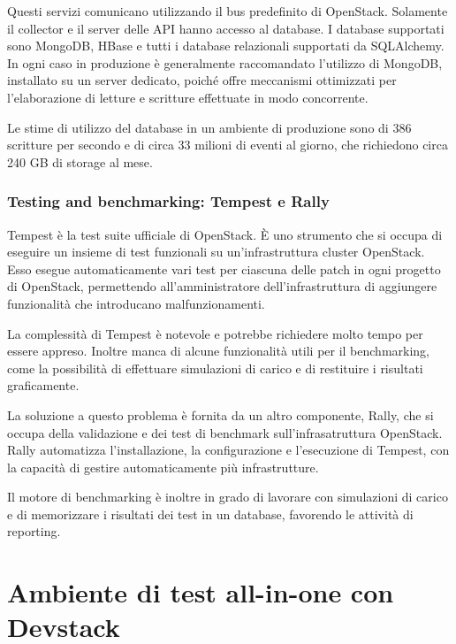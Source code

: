 \documentclass[../main.tex]{subfiles}
\begin{document}
Questi servizi comunicano utilizzando il bus predefinito di OpenStack. Solamente il collector e il server delle API hanno accesso al database.
I database supportati sono MongoDB, HBase e tutti i database relazionali  supportati da SQLAlchemy.
In ogni caso in produzione è generalmente raccomandato l'utilizzo di MongoDB,  installato su un server dedicato, poiché offre meccanismi ottimizzati per l'elaborazione di letture e scritture effettuate in modo concorrente.

Le stime di utilizzo del database in un ambiente di produzione sono di 386 scritture per secondo e di circa 33 milioni di eventi al giorno, che richiedono circa 240 GB di storage al mese.

\subsubsection{Testing and benchmarking: Tempest e Rally}
Tempest è la test suite ufficiale di OpenStack. \`E uno strumento che si occupa di eseguire un insieme di test funzionali su un'infrastruttura cluster OpenStack.
Esso esegue automaticamente vari test per ciascuna delle patch in ogni progetto di OpenStack, permettendo all'amministratore dell'infrastruttura di aggiungere funzionalità che introducano malfunzionamenti.

La complessità di Tempest è notevole e potrebbe richiedere molto tempo per essere appreso. Inoltre manca di alcune funzionalità utili per il benchmarking, come la possibilità di effettuare simulazioni di carico e di restituire i risultati graficamente.

La soluzione a questo problema è fornita da un altro componente, Rally, che si occupa della validazione e dei test di benchmark sull'infrasatruttura OpenStack.
Rally automatizza l'installazione, la configurazione e l'esecuzione di Tempest, con la capacità di gestire automaticamente più infrastrutture.

Il motore di benchmarking è inoltre in grado di lavorare con simulazioni di carico e di memorizzare i risultati dei test in un database, favorendo le attività di reporting.
\vfill
\newpage

\section{Ambiente di test all-in-one con Devstack}
\end{document}
